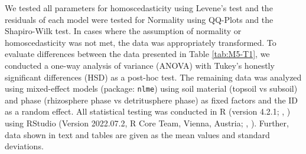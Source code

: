 We tested all parameters for homoscedasticity using Levene's test and the residuals of each model were tested for Normality using QQ-Plots and the Shapiro-Wilk test. In cases where the assumption of normality or homoscedasticity was not met, the data was appropriately transformed. To evaluate differences between the data presented in Table \ref{tab:M5-T1}, we conducted a one-way analysis of variance (ANOVA) with Tukey's honestly significant differences (HSD) as a post-hoc test. The remaining data was analyzed using mixed-effect models (package: \texttt{nlme}) using soil material (topsoil vs subsoil) and phase (rhizosphere phase vs detritusphere phase) as fixed factors and the ID as a random effect. All statistical testing was conducted in R (version 4.2.1; \citeauthor{RCoreTeam2008}, \citeyear{RCoreTeam2008}) using RStudio (Version 2022.07.2, R Core Team, Vienna, Austria; \citeauthor{RStudioTeam2015}, \citeyear{RStudioTeam2015}). Further, data shown in text and tables are given as the mean values and standard deviations.



